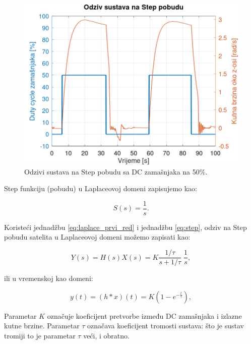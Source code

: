 \documentclass[times, utf8, diplomski, numeric]{templates/template}
\begin{document}
{{{            \begin{figure}[htb]
            \centering
            \includegraphics[width=1.0\textwidth]{other/step_response.png}
            \caption{Odzivi sustava na Step pobudu sa DC zamašnjaka na 50\%.}
            \label{fig:step_response}
            \end{figure}

            Step funkciju (pobudu) u Laplaceovoj domeni zapisujemo kao:

            \begin{equation}
            \label{eq:step}
                S(s) = \frac{1}{s}.
            \end{equation}

            Koristeći jednadžbu \ref{eq:laplace_prvi_red} i jednadžbu \ref{eq:step}, odziv na Step pobudu satelita u Laplaceovoj domeni možemo zapisati kao:

            \begin{equation}
                Y(s) = H(s)X(s) = K \frac{1/\tau}{s + 1/\tau} \; \frac{1}{s},
            \end{equation}

            ili u vremenskoj kao domeni:

            \begin{equation}
                y(t) = (h \ast x)(t) = K (1 - e^{-\frac{t}{\tau}}),
            \end{equation}

            Parametar $K$ označuje koeficijent pretvorbe između DC zamašnjaka i izlazne kutne brzine. Parametar $\tau$ označava koeficijent tromosti sustava: što je sustav tromiji to je parametar $\tau$ veći, i obratno.

}}}
\end{document}
